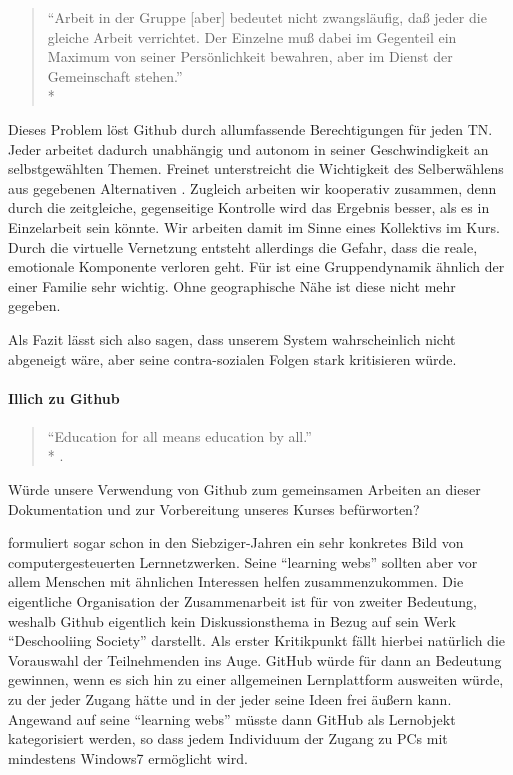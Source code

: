 \begin{quote}
	``Arbeit in der Gruppe [aber] bedeutet nicht zwangsläufig, daß jeder die gleiche Arbeit verrichtet. Der Einzelne muß dabei im Gegenteil ein Maximum von seiner Persönlichkeit bewahren, aber im Dienst der Gemeinschaft stehen.''\\*
	\parencite[510]{Freinet-2000a}
\end{quote}

Dieses Problem löst Github durch allumfassende Berechtigungen für jeden TN.
Jeder arbeitet dadurch unabhängig und autonom in seiner Geschwindigkeit an selbstgewählten Themen.
Freinet unterstreicht die Wichtigkeit des Selberwählens aus gegebenen Alternativen \parencite[vgl.][495]{Freinet-2000a}.
Zugleich arbeiten wir kooperativ zusammen, denn durch die zeitgleiche, gegenseitige Kontrolle  wird das Ergebnis besser, als es in Einzelarbeit sein könnte.
Wir arbeiten damit im Sinne eines Kollektivs im Kurs.
Durch die virtuelle Vernetzung entsteht allerdings die Gefahr, dass die reale, emotionale Komponente verloren geht.
Für \citeauthor{Freinet-2000a} ist eine Gruppendynamik ähnlich der einer Familie sehr wichtig.
Ohne geographische Nähe ist diese nicht mehr gegeben.

Als Fazit lässt sich also sagen, dass \citeauthor{Freinet-2000a} unserem System wahrscheinlich nicht abgeneigt wäre, aber seine contra-sozialen Folgen stark kritisieren würde.


\paragraph{Illich zu Github}

\begin{quote}
	``Education for all means education by all.''\\*
	\parencite[17]{Illich-1971}.
\end{quote}

Würde \citeauthor{Illich-1971} unsere Verwendung von Github zum gemeinsamen Arbeiten an dieser Dokumentation und zur Vorbereitung unseres Kurses befürworten?

\citeauthor{Illich-1971} formuliert sogar schon in den Siebziger-Jahren ein sehr konkretes Bild von computergesteuerten Lernnetzwerken.
Seine ``learning webs'' sollten aber vor allem Menschen mit ähnlichen Interessen helfen zusammenzukommen.
Die eigentliche Organisation der Zusammenarbeit ist für \citeauthor{Illich-1971} von zweiter Bedeutung, weshalb Github eigentlich kein Diskussionsthema in Bezug auf sein Werk ``Deschooliing Society'' darstellt.
Als erster Kritikpunkt fällt hierbei natürlich die Vorauswahl der Teilnehmenden ins Auge.
GitHub würde für \citeauthor{Illich-1971} dann an Bedeutung gewinnen, wenn es sich hin zu einer allgemeinen Lernplattform ausweiten würde, zu der jeder Zugang hätte und in der jeder seine Ideen frei äußern kann.
Angewand auf seine ``learning webs'' müsste dann GitHub als Lernobjekt kategorisiert werden, so dass jedem Individuum der Zugang zu PCs mit mindestens Windows7 ermöglicht wird.

